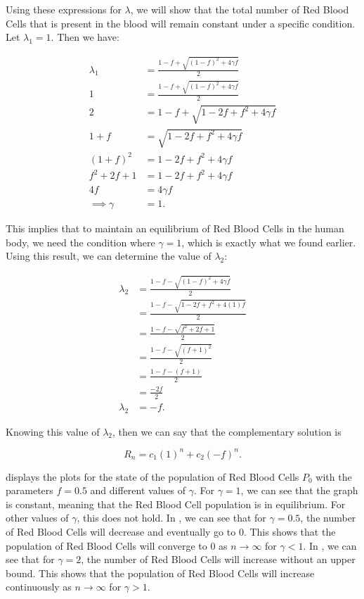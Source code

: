 Using these expressions for $\lambda$, we will show that the total number of Red Blood Cells that is present in the blood will remain constant under a specific condition. Let $\lambda_1=1$. Then we have:

\begin{align*}
    \lambda_1 &= \frac{1-f + \sqrt{(1-f)^2 + 4\gamma f}}{2}\\
    1 &= \frac{1-f + \sqrt{(1-f)^2 + 4\gamma f}}{2}\\
    2 &= 1-f + \sqrt{1 - 2f + f^2 + 4\gamma f}\\
    1 + f &= \sqrt{1 - 2f + f^2 + 4\gamma f}\\
    (1 + f)^2 &= 1 - 2f + f^2 + 4\gamma f\\
    f^2 + 2f + 1 &= 1 - 2f + f^2 + 4\gamma f\\
    4f &= 4\gamma f\\
    \implies\gamma &= 1.
\end{align*}

This implies that to maintain an equilibrium of Red Blood Cells in the human body, we need the condition where $\gamma = 1$, which is exactly what we found earlier. Using this result, we can determine the value of $\lambda_2$:

\begin{align*}
    \lambda_2 &= \frac{1-f - \sqrt{(1-f)^2 + 4\gamma f}}{2}\\
    &= \frac{1-f - \sqrt{1-2f+f^2 + 4(1)f}}{2}\\
    &= \frac{1-f - \sqrt{f^2+2f+1}}{2}\\
    &= \frac{1-f - \sqrt{(f+1)^2}}{2}\\
    &= \frac{1-f - (f+1)}{2}\\
    &= \frac{-2f}{2}\\
    \lambda_2 &= -f.
\end{align*}

Knowing this value of $\lambda_2$, then we can say that the complementary solution is

\begin{equation} \label{eq:7}
    R_n = c_1(1)^n + c_2(-f)^n.
\end{equation}


 displays the plots for the state of the population of Red Blood Cells $P_0$ with the parameters $f=0.5$ and different values of $\gamma$. For $\gamma=1$, we can see that the graph is constant, meaning that the Red Blood Cell population is in equilibrium. For other values of $\gamma$, this does not hold. In , we can see that for $\gamma = 0.5$, the number of Red Blood Cells will decrease and eventually go to 0. This shows that the population of Red Blood Cells will converge to 0 as $n\to\infty$ for $\gamma < 1$. In , we can see that for $\gamma = 2$, the number of Red Blood Cells will increase without an upper bound. This shows that the population of Red Blood Cells will increase continuously as $n\to\infty$ for $\gamma > 1$.

